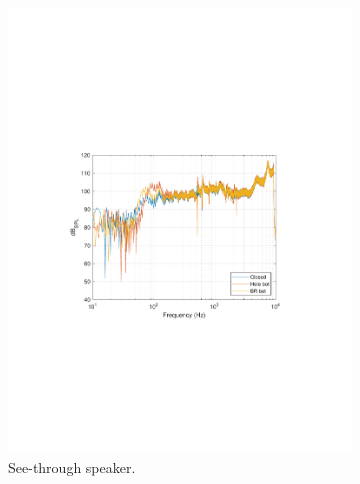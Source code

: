 \begin{figure}
	\centering
	\begin{subfigure}{.5\textwidth}
		\centering
		\includegraphics[width=.9\linewidth, clip, trim={3.9cm 8.4cm 4.5cm 9cm}]{gfx/SpeakerMeas/PGcompare.pdf}
		\caption{See-through speaker.}
		\label{fig:PGcompareAll}
	\end{subfigure}%
	\begin{subfigure}{.5\textwidth}
		\centering

\end{subfigure}
\end{figure}
